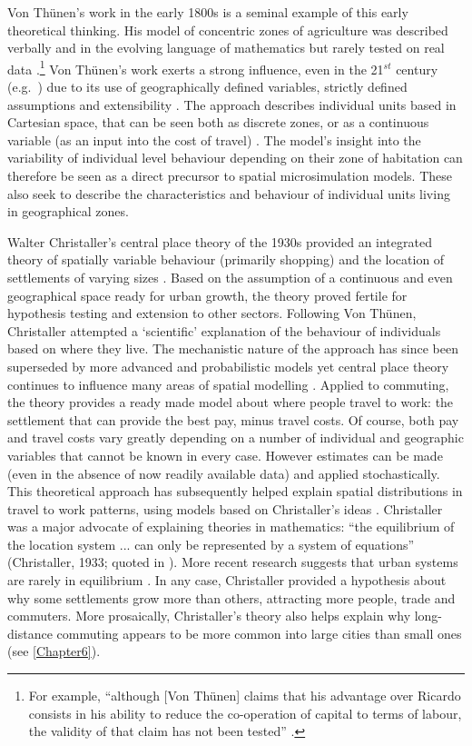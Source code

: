 \documentclass[a4paper, 11pt, twoside]{Thesis}
\begin{document}
Von Th\"{u}nen's work in the early 1800s is a seminal example of this early
theoretical thinking. His model of concentric zones of agriculture was
described verbally and in the evolving language of mathematics but rarely tested
on real data \citep{Moore1895-thesis}.\footnote{For
example, ``although [Von
Th\"{u}nen] claims that his advantage over Ricardo consists in his ability to
reduce the co-operation of capital to terms of labour, the validity of that
claim has not been tested'' \citep[p.~126]{Moore1895-thesis}.
} 
Von Th\"{u}nen's work exerts a strong
influence, even in the 21$^{st}$ century (e.g.~\citealp{lankoski2008bioenergy}) 
due to its use of geographically defined variables, strictly 
defined assumptions and extensibility \citep{sasaki2003agent}. 
The approach describes individual units based in
Cartesian space, that can be seen both as discrete zones, or as
a continuous variable (as an input into the cost of travel)
\citep{Stevens1968a}. The model's insight into the variability of
individual level behaviour depending on their zone of habitation can therefore
be seen as a direct precursor to spatial microsimulation models. These also
seek to describe the characteristics and behaviour of individual units living in
geographical zones.

Walter Christaller's central place theory of the 1930s provided an integrated
theory of spatially variable behaviour (primarily shopping) and the location of
settlements of varying sizes \citep{matthews2008geography}. Based on the
assumption of a continuous and even geographical space ready for urban growth,
the theory proved fertile for hypothesis testing and extension to other sectors.
Following Von Th\"{u}nen, Christaller
attempted a `scientific' explanation of the behaviour of individuals based on
where they live. The mechanistic nature of the approach has since been
superseded by more advanced and probabilistic models
yet central place theory continues to influence
many areas of spatial modelling \citep{Wilson1972-theoretical, Sonis2005,
Farooq2012-integreted}. Applied to commuting, the theory provides a ready made
model about where people travel to work: the settlement that can provide the
best pay, minus travel costs. Of course, both pay and travel costs vary greatly
depending on a number of individual and geographic variables that cannot be known
in every case. However estimates can be made (even in the absence of now
readily available data) and applied stochastically. 
This theoretical approach has subsequently helped
explain spatial distributions in travel to work patterns, using models based on
Christaller's ideas \citep{Tabuchi2006-commuting-costs}. Christaller was
a major advocate of explaining theories in
mathematics: ``the equilibrium of the location system ... can only be
represented by a system of equations'' (Christaller, 1933; quoted in
\citealp[p.~35]{Wilson1972-theoretical}).
More recent research suggests that urban systems are rarely in equilibrium
\citep{batty2007cities}. In any case, Christaller provided a hypothesis about
why some settlements grow more than others, attracting more people, trade and
commuters.
More prosaically, Christaller's theory also helps explain why
long-distance commuting appears to be more common into large cities than small ones
(see \cref{Chapter6}).
\end{document}
